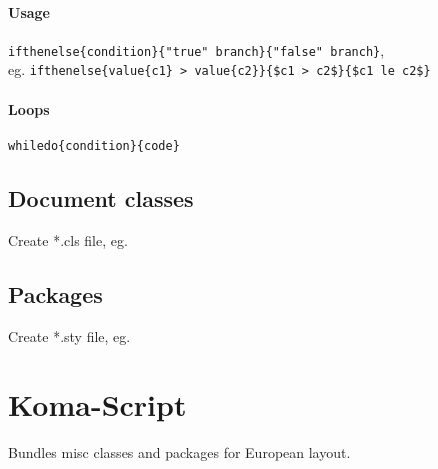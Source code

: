         \paragraph{Usage}{
            \texttt{\bs ifthenelse\{condition\}\{"true" branch\}\{"false" branch\}}, \\
            eg. \texttt{\bs ifthenelse\{\bs value\{c1\} > \bs value\{c2\}\}\{\$c1 > c2\$\}\{\$c1 \bs le c2\$\}}
        }
            
        \paragraph{Loops}{
            \texttt{\bs whiledo\{condition\}\{code\}}
        }
    
    \subsection{Document classes}
        Create *.cls file, eg. \\
    
    \subsection{Packages}
        Create *.sty file, eg. \\

\section{Koma-Script}
    Bundles misc classes and packages for European layout.
    
